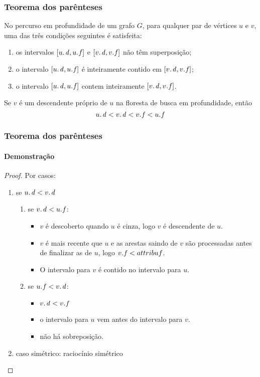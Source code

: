 \documentclass{beamer}
\begin{document}
\begin{frame}
\frametitle{Teorema dos parênteses}

\begin{theorem}
No percurso em profundidade de um grafo $G$, para qualquer par de vértices $u$ e $v$, uma
das três condições seguintes é satisfeita:
\begin{enumerate}
\item os intervalos $[\attrib{u}{d}, \attrib{u}{f}]$ e $[\attrib{v}{d}, \attrib{v}{f}]$ não têm superposição;
\item o intervalo $[\attrib{u}{d}, \attrib{u}{f}]$ é inteiramente contido em $[\attrib{v}{d}, \attrib{v}{f}]$;
\item o intervalo $[\attrib{u}{d}, \attrib{u}{f}]$ contem inteiramente $[\attrib{v}{d}, \attrib{v}{f}]$.
\end{enumerate}
\end{theorem}

\begin{corollary}
Se $v$ é um descendente próprio de $u$ na floresta de busca em profundidade, então
$$\attrib{u}{d} < \attrib{v}{d} < \attrib{v}{f} < \attrib{u}{f}$$
\end{corollary}

\end{frame}

\begin{frame}
\frametitle{Teorema dos parênteses}
\framesubtitle{Demonstração}

\begin{proof}
Por casos:
\begin{enumerate}
\item se $\attrib{u}{d} < \attrib{v}{d}$
\begin{enumerate}
\item se $\attrib{v}{d} < \attrib{u}{f}$: 
\begin{itemize}
\item $v$ é descoberto quando $u$ é cinza, logo $v$ é descendente de $u$.
\item $v$ é mais recente que $u$ e as arestas saindo de $v$ são processadas 
  antes de finalizar as de $u$, logo $\attrib{v}{f} < attrib{u}{f}$. 
\item O intervalo para $v$ é contido no intervalo para $u$.
\end{itemize}
\item se $\attrib{u}{f} < \attrib{v}{d}$: 
\begin{itemize}
\item $\attrib{v}{d} < \attrib{v}{f}$
\item o intervalo para $u$ vem antes do intervalo para $v$. 
\item não há sobreposição.
\end{itemize}
\end{enumerate}
\item caso simétrico: raciocínio simétrico
\end{enumerate}
\end{proof}

\end{frame}
\end{document}
